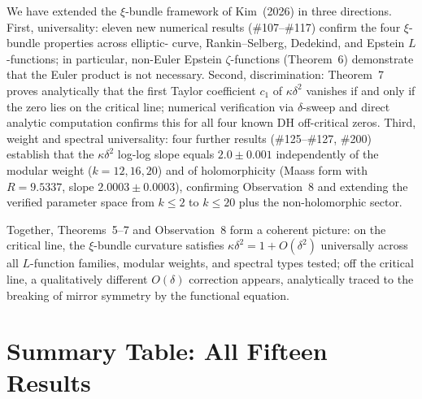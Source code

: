 \documentclass[11pt, a4paper]{article}
\theoremstyle{plain}
\theoremstyle{definition}
\begin{document}
We have extended the $\xi$-bundle framework of Kim~(2026) in three
directions.  First, universality: eleven new numerical results
(\#107--\#117) confirm the four $\xi$-bundle properties across elliptic-
curve, Rankin--Selberg, Dedekind, and Epstein $L$-functions; in
particular, non-Euler Epstein $\zeta$-functions (Theorem~6) demonstrate
that the Euler product is not necessary.  Second, discrimination:
Theorem~7 proves analytically that the first Taylor coefficient
$c_{1}$ of $\kappa\delta^{2}$ vanishes if and only if the zero lies on
the critical line; numerical verification via $\delta$-sweep and direct
analytic computation confirms this for all four known DH off-critical
zeros.  Third, weight and spectral universality: four further results
(\#125--\#127, \#200) establish that the $\kappa\delta^{2}$ log-log slope
equals $2.0\pm 0.001$ independently of the modular weight ($k=12,16,20$)
and of holomorphicity (Maass form with $R=9.5337$, slope
$2.0003\pm 0.0003$), confirming Observation~8 and extending the verified
parameter space from $k\leq 2$ to $k\leq 20$ plus the non-holomorphic
sector.

Together, Theorems~5--7 and Observation~8 form a coherent picture:
on the critical line, the $\xi$-bundle curvature satisfies
$\kappa\delta^{2}=1+O(\delta^{2})$ universally across all $L$-function
families, modular weights, and spectral types tested; off the critical
line, a qualitatively different $O(\delta)$ correction appears,
analytically traced to the breaking of mirror symmetry by the functional
equation.


\appendix

\section{Summary Table: All Fifteen Results}
\label{app:summary}
\end{document}
